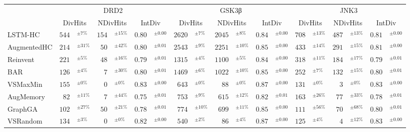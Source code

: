 \begin{tabular}{lr@{}lr@{}lr@{}lr@{}lr@{}lr@{}lr@{}lr@{}lr@{}l}
\toprule
 & \multicolumn{6}{c}{DRD2} & \multicolumn{6}{c}{GSK3β} & \multicolumn{6}{c}{JNK3} \\
\cmidrule(lr){2-7} \cmidrule(lr){8-13} \cmidrule(lr){14-19}
 & \multicolumn{2}{c}{DivHits} & \multicolumn{2}{c}{NDivHits} & \multicolumn{2}{c}{IntDiv} & \multicolumn{2}{c}{DivHits} & \multicolumn{2}{c}{NDivHits} & \multicolumn{2}{c}{IntDiv} & \multicolumn{2}{c}{DivHits} & \multicolumn{2}{c}{NDivHits} & \multicolumn{2}{c}{IntDiv} \\
\midrule
LSTM-HC & $544$& $^{\pm7\%}$ & $154$& $^{\pm15\%}$ & $0.80$& $^{\pm0.00}$ & $2620$& $^{\pm7\%}$ & $2045$& $^{\pm8\%}$ & $0.84$& $^{\pm0.00}$ & $708$& $^{\pm13\%}$ & $487$& $^{\pm13\%}$ & $0.81$& $^{\pm0.00}$ \\
AugmentedHC & $214$& $^{\pm31\%}$ & $50$& $^{\pm42\%}$ & $0.80$& $^{\pm0.01}$ & $2543$& $^{\pm9\%}$ & $2251$& $^{\pm10\%}$ & $0.85$& $^{\pm0.00}$ & $433$& $^{\pm14\%}$ & $291$& $^{\pm15\%}$ & $0.81$& $^{\pm0.00}$ \\
Reinvent & $221$& $^{\pm5\%}$ & $48$& $^{\pm16\%}$ & $0.79$& $^{\pm0.01}$ & $1315$& $^{\pm4\%}$ & $1100$& $^{\pm5\%}$ & $0.84$& $^{\pm0.00}$ & $318$& $^{\pm11\%}$ & $184$& $^{\pm17\%}$ & $0.79$& $^{\pm0.01}$ \\
BAR & $126$& $^{\pm4\%}$ & $7$& $^{\pm30\%}$ & $0.80$& $^{\pm0.01}$ & $1469$& $^{\pm6\%}$ & $1022$& $^{\pm10\%}$ & $0.85$& $^{\pm0.00}$ & $252$& $^{\pm7\%}$ & $132$& $^{\pm15\%}$ & $0.80$& $^{\pm0.01}$ \\
VSMaxMin & $155$& $^{\pm0\%}$ & $0$& $^{\pm0\%}$ & $0.83$& $^{\pm0.00}$ & $643$& $^{\pm0\%}$ & $88$& $^{\pm0\%}$ & $0.87$& $^{\pm0.00}$ & $131$& $^{\pm0\%}$ & $3$& $^{\pm0\%}$ & $0.83$& $^{\pm0.00}$ \\
AugMemory & $82$& $^{\pm11\%}$ & $7$& $^{\pm44\%}$ & $0.75$& $^{\pm0.01}$ & $753$& $^{\pm9\%}$ & $615$& $^{\pm12\%}$ & $0.82$& $^{\pm0.01}$ & $163$& $^{\pm26\%}$ & $77$& $^{\pm33\%}$ & $0.78$& $^{\pm0.01}$ \\
GraphGA & $102$& $^{\pm27\%}$ & $50$& $^{\pm21\%}$ & $0.78$& $^{\pm0.01}$ & $774$& $^{\pm10\%}$ & $699$& $^{\pm11\%}$ & $0.85$& $^{\pm0.00}$ & $111$& $^{\pm56\%}$ & $70$& $^{\pm68\%}$ & $0.80$& $^{\pm0.01}$ \\
VSRandom & $134$& $^{\pm3\%}$ & $0$& $^{\pm0\%}$ & $0.82$& $^{\pm0.00}$ & $540$& $^{\pm2\%}$ & $86$& $^{\pm4\%}$ & $0.87$& $^{\pm0.00}$ & $125$& $^{\pm4\%}$ & $4$& $^{\pm12\%}$ & $0.83$& $^{\pm0.00}$ \\

\end{tabular}
